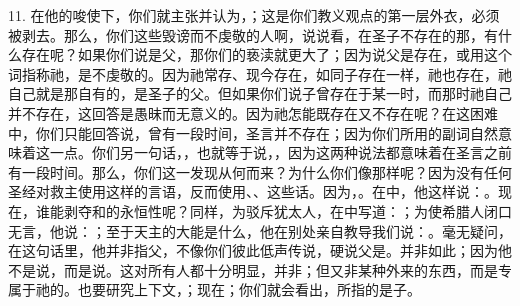 11. 在他的唆使下，你们就主张并认为，；这是你们教义观点的第一层外衣，必须被剥去。那么，你们这些毁谤而不虔敬的人啊，说说看，在圣子不存在的那，有什么存在呢？如果你们说是父，那你们的亵渎就更大了；因为说父是存在，或用这个词指称祂，是不虔敬的。因为祂常存、现今存在，如同子存在一样，祂也存在，祂自己就是那自有的，是圣子的父。但如果你们说子曾存在于某一时，而那时祂自己并不存在，这回答是愚昧而无意义的。因为祂怎能既存在又不存在呢？在这困难中，你们只能回答说，曾有一段时间，圣言并不存在；因为你们所用的副词自然意味着这一点。你们另一句话，，也就等于说，，因为这两种说法都意味着在圣言之前有一段时间。那么，你们这一发现从何而来？为什么你们像那样呢？因为没有任何圣经对救主使用这样的言语，反而使用、、这些话。因为，。在中，他这样说：。现在，谁能剥夺和的永恒性呢？同样，为驳斥犹太人，在中写道：；为使希腊人闭口无言，他说：；至于天主的大能是什么，他在别处亲自教导我们说：。毫无疑问，在这句话里，他并非指父，不像你们彼此低声传说，硬说父是。并非如此；因为他不是说，而是说。这对所有人都十分明显，并非；但又非某种外来的东西，而是专属于祂的。也要研究上下文，；现在；你们就会看出，所指的是子。\par

